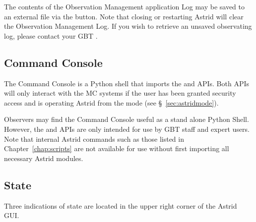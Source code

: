 The contents of the Observation Management application Log may be saved to an external
file via the  button.  Note that closing or restarting \gls{Astrid} will
clear the Observation Management Log.  If you wish to retrieve an unsaved observating log,
please contact your \gls{GBT} .

\subsection{Command Console}
The Command Console is a Python shell that imports the  and
 \glspl{API}.  Both \glspl{API} will only interact with the \gls{MC}
systems if the user has been granted security access and is operating \gls{Astrid}
from the  mode (see \S~\ref{sec:astridmode}).

Observers may find the Command Console useful as a stand alone Python Shell.  However,
the  and  \glspl{API} are only intended for use by
\gls{GBT} staff and expert users.  Note that internal \gls{Astrid} commands
such as those listed in Chapter~\ref{chap:scripts} are not available for use without
first importing all necessary \gls{Astrid} modules.

\newpage

\subsection{State}\label{sec:GBTstatusDescription}

Three indications of state are located in the upper right corner of the \gls{Astrid}
\gls{GUI}.

